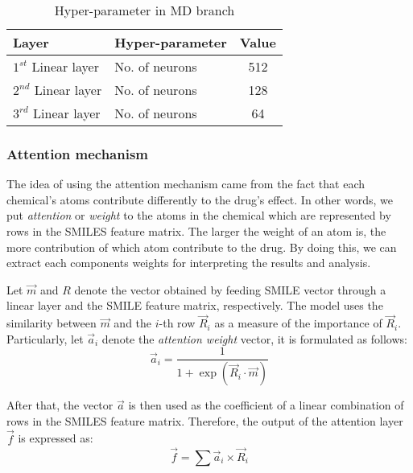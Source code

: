 \documentclass[conference]{IEEEtran}
\begin{document}
\begin{table}[htbp]
    \caption{Hyper-parameter in MD branch}
    \begin{center}
        \begin{tabular}{llc}
            \hline
            \textbf{Layer}                               & \textbf{Hyper-parameter} & \textbf{Value} \\
            \hline
            {$1^{st}$ Linear layer}    & No. of neurons              & 512     \\
            {$2^{nd}$ Linear layer}    & No. of neurons              & 128     \\
            {$3^{rd}$ Linear layer}    & No. of neurons              & 64     \\
            \hline
        \end{tabular}
        \label{mdhp}
    \end{center}
\end{table}

\subsubsection{Attention mechanism}

The idea of using the attention mechanism came from the fact that each chemical's atoms contribute differently to the drug's effect. In other words, we put \textit{attention} or \textit{weight} to the atoms in the chemical which are represented by rows in the SMILES feature matrix. The larger the weight of an atom is, the more contribution of which atom contribute to the drug. By doing this, we can extract each components weights for interpreting the results and analysis.

Let $\Vec{m}$ and $R$ denote the vector obtained by feeding SMILE vector through a linear layer and the SMILE feature matrix,  respectively. The model uses the similarity between $\Vec{m}$ and the $i$-th row $\Vec{R}_i$ as a measure of the importance of $\Vec{R}_i$. Particularly, let $\Vec{a}_i$ denote the \textit{attention weight} vector, it is formulated as follows:
\begin{equation}
    \Vec{a}_i = \frac{1}{1 + \exp \left( \Vec{R}_i \cdot \Vec{m} \right)}
\end{equation}

After that, the vector $\Vec{a}$ is then used as the coefficient of a linear combination of rows in the SMILES feature matrix. Therefore, the output of the attention layer $\Vec{f}$ is expressed as:
\begin{equation}
    \Vec{f} = \sum \Vec{a}_i \times \Vec{R}_i
\end{equation}
\end{document}
